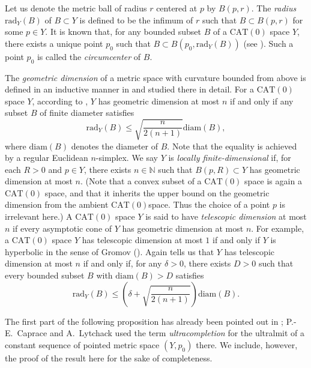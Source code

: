 \documentclass[12pt]{amsart}
\numberwithin{equation}{section}
\theoremstyle{plain}
\theoremstyle{definition}
\theoremstyle{remark}
\newcommand{\N}{{\mathbb N}}
\newcommand{\diam}[1]{\mathrm{diam}(#1)}
\newcommand{\rad}[2]{\mathrm{rad}_{#1}({#2})}
\newcommand{\cat}[1]{\mathrm{CAT}(#1)}
\begin{document}
Let us denote the metric ball of radius $r$ centered at $p$ by
$B(p,r)$. 
The {\it radius} $\rad{Y}{B}$ of $B \subset Y$ is defined to be the
infimum of $r$ such that $B\subset B(p,r)$ for some $p\in Y$. 
It is known that, for any bounded subset $B$ of a $\cat{0}$ space $Y$,
there exists a unique point $p_0$ such that 
$B\subset B(p_0, \rad{Y}{B})$ 
(see \cite[p.~179, 2.7 Proposition]{bridson-haefliger}). 
Such a point $p_0$ is called the {\it circumcenter} of $B$. 

The {\it geometric dimension} of a metric space with curvature bounded
from above is defined in an inductive manner in \cite{kleiner} and
studied there in detail.  
For a $\cat{0}$ space $Y$, 
according to \cite[Theorem 1.3]{caprace1}, $Y$
has geometric dimension at most $n$ if and only if any subset $B$ of
finite diameter satisfies 
\begin{equation}
\label{eq:geom_dim}
 \rad{Y}{B} \leq \sqrt{\frac{n}{2(n+1)}} \diam{B},  
\end{equation}
where $\diam{B}$ denotes the diameter of $B$.
Note that the equality is achieved by a regular Euclidean $n$-simplex. 
We say $Y$ is {\it locally finite-dimensional} if, for each $R>0$ and 
$p \in Y$, there exists $n \in \N$ such that $B(p,R) \subset Y$ has
geometric dimension at most $n$.  (Note that a convex subset of a
$\cat{0}$ space is again a $\cat{0}$ space, and that it inherits the
upper bound on the geometric dimension from the ambient
$\cat{0}$space.  Thus the choice of a point $p$ is irrelevant
here.)
A $\cat{0}$ space $Y$ is said to have {\it telescopic dimension} at most
$n$ if every asymptotic cone of $Y$ has geometric dimension at most
$n$. 
For example, a $\cat{0}$ space $Y$ has telescopic 
dimension at most $1$
if and only if $Y$ is hyperbolic in the sense of Gromov
(\cite{caprace1}). 
Again \cite[Theorem 1.3]{caprace1} tells us that $Y$ has telescopic
dimension at most $n$ if and only if, for any $\delta>0$, there exists
$D>0$ such that every bounded subset $B$ with $\diam{B} > D$
satisfies 
\begin{equation}
\label{eq:tele_dim}
 \rad{Y}{B} \leq 
 \left(\delta +\sqrt{\frac{n}{2(n+1)}} \right) \diam{B}. 
\end{equation}

The first part of the following proposition has already been pointed out
in \cite[Lemma A.2]{caprace1-2}; P.-E.~Caprace and A.~Lytchack used the
term {\it ultracompletion} for the ultralmit of a constant sequence of
pointed metric space $(Y,p_0)$ there.  
We include, however,  the proof of the result here for the sake of
completeness.  
\end{document}
